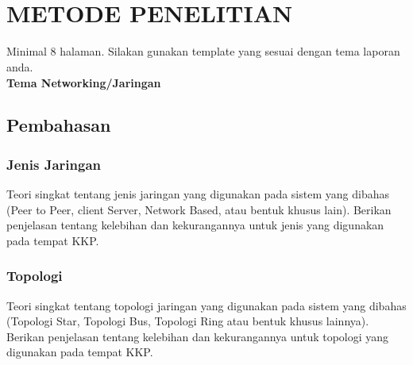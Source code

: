 
\chapter[METODE PENELITIAN]{\\ METODE PENELITIAN}

Minimal 8 halaman. Silakan gunakan template yang sesuai dengan tema laporan anda.\\

\textbf{Tema Networking/Jaringan}

\setcounter{section}{0} %
\setcounter{subsection}{0} %

\section{Pembahasan}

\subsection{Jenis Jaringan}
\begin{subsectioncontent}
    \hspace{\parindent}Teori singkat tentang jenis jaringan yang digunakan pada sistem yang dibahas (Peer to Peer, client Server, Network Based, atau bentuk khusus lain). Berikan penjelasan tentang kelebihan dan kekurangannya untuk jenis yang digunakan pada tempat KKP.
\end{subsectioncontent}

\subsection{Topologi}
\begin{subsectioncontent}
    \hspace{\parindent}Teori singkat tentang topologi jaringan yang digunakan pada sistem yang dibahas (Topologi Star, Topologi Bus, Topologi Ring atau bentuk khusus lainnya). Berikan penjelasan tentang kelebihan dan kekurangannya untuk topologi yang digunakan pada tempat KKP.
\end{subsectioncontent}

